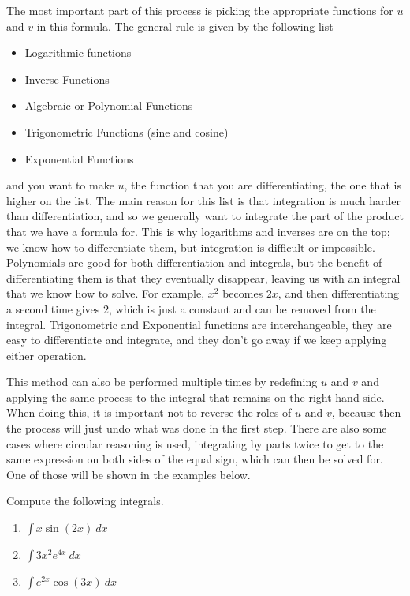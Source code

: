 The most important part of this process is picking the appropriate functions for $u$ and $v$ in this formula. The general rule is given by the following list
\begin{itemize}
\item Logarithmic functions
\item Inverse Functions
\item Algebraic or Polynomial Functions
\item Trigonometric Functions (sine and cosine)
\item Exponential Functions
\end{itemize}
and you want to make $u$, the function that you are differentiating, the one that is higher on the list. The main reason for this list is that integration is much harder than differentiation, and so we generally want to integrate the part of the product that we have a formula for. This is why logarithms and inverses are on the top; we know how to differentiate them, but integration is difficult or impossible. Polynomials are good for both differentiation and integrals, but the benefit of differentiating them is that they eventually disappear, leaving us with an integral that we know how to solve. For example, $x^2$ becomes $2x$, and then differentiating a second time gives $2$, which is just a constant and can be removed from the integral. Trigonometric and Exponential functions are interchangeable, they are easy to differentiate and integrate, and they don't go away if we keep applying either operation.

This method can also be performed multiple times by redefining $u$ and $v$ and applying the same process to the integral that remains on the right-hand side. When doing this, it is important not to reverse the roles of $u$ and $v$, because then the process will just undo what was done in the first step. There are also some cases where circular reasoning is used, integrating by parts twice to get to the same expression on both sides of the equal sign, which can then be solved for. One of those will be shown in the examples below.

\begin{example}
Compute the following integrals.
\begin{enumerate}
\item $\int x\sin(2x)\ dx$
\item $\int 3x^2e^{4x}\ dx$
\item $\int e^{2x}\cos(3x)\ dx$
\end{enumerate}
\end{example}

